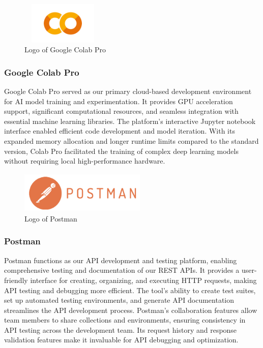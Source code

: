 \documentclass[conference]{IEEEtran}
\begin{document}
        \begin{figure}[htbp]
            \centerline{\includegraphics[width=4cm, height=2cm]{Images/logo/google colab pro.png}}
            \caption{Logo of Google Colab Pro}
            \label{fig}
        \end{figure}
        \subsubsection{Google Colab Pro}
            Google Colab Pro served as our primary cloud-based development environment for AI model training and experimentation. It provides GPU acceleration support, significant computational resources, and seamless integration with essential machine learning libraries. The platform's interactive Jupyter notebook interface enabled efficient code development and model iteration. With its expanded memory allocation and longer runtime limits compared to the standard version, Colab Pro facilitated the training of complex deep learning models without requiring local high-performance hardware.

        \begin{figure}[htbp]
            \centerline{\includegraphics[width=6cm, height=2cm]{Images/logo/postman.png}}
            \caption{Logo of Postman}
            \label{fig}
        \end{figure}
        \subsubsection{Postman}
            Postman functions as our API development and testing platform, enabling comprehensive testing and documentation of our REST APIs. It provides a user-friendly interface for creating, organizing, and executing HTTP requests, making API testing and debugging more efficient. The tool's ability to create test suites, set up automated testing environments, and generate API documentation streamlines the API development process. Postman's collaboration features allow team members to share collections and environments, ensuring consistency in API testing across the development team. Its request history and response validation features make it invaluable for API debugging and optimization.
\end{document}

